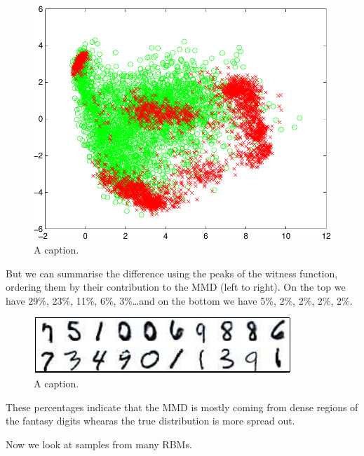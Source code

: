 \documentclass{article} %
\begin{document}
\begin{figure}[ht]
\centering
\includegraphics[width=0.98\columnwidth]{figures/rbm_pca}
\caption{
A caption.
}
\label{fig:rbm_pca}
\end{figure}

But we can summarise the difference using the peaks of the witness function, ordering them by their contribution to the MMD (left to right).
On the top we have 29\%, 23\%, 11\%, 6\%, 3\%\ldots and on the bottom we have 5\%, 2\%, 2\%, 2\%, 2\%.

\begin{figure}[ht]
\centering
\includegraphics[width=0.98\columnwidth]{figures/rbm_witness_peaks}
\caption{
A caption.
}
\label{fig:rbm_witness_peaks}
\end{figure}

These percentages indicate that the MMD is mostly coming from dense regions of the fantasy digits whearas the true distribution is more spread out.

Now we look at samples from many RBMs.
\end{document}
